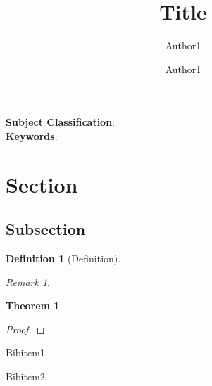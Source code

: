 \documentclass[12pt,a4paper]{article}
\title{\textbf{Title}}
\author[1]{Author1}
\affil[1]{\footnotesize Department, Institute}
\author[2]{Author1}
\affil[2]{\footnotesize Department, Institute}
\date{}
\theoremstyle{definition}
\newtheorem{definition}{Definition}
\newtheorem{theorem}{Theorem}
\theoremstyle{remark}
\newtheorem*{remark}{Remark}
\begin{document}
\maketitle

\begin{abstract}

\end{abstract}

\begin{flushleft}
\textbf{Subject Classification}:\\
\textbf{Keywords}:
\end{flushleft}

\section{Section}

\subsection{Subsection}

\begin{definition}[Definition]
\end{definition}

\begin{remark}
\end{remark}

\begin{theorem}\label{thm1}
\end{theorem}
\begin{proof}
\end{proof}

\begin{thebibliography}{1}

 Bibitem1

 Bibitem2

\end{thebibliography}
\end{document}
